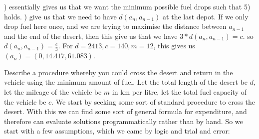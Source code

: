 \documentclass{homework}
\begin{document}
\newline{}) essentially gives us that we want the minimum possible fuel drops such that 5) holds.
\newline{}) give us that we need to have $d(a_n, a_{n-1})$ at the last depot. If we only drop fuel here once, and we are trying to maximise the distance between $a_{n-1}$ and the end of the desert, then this give us that we have $3*d(a_n, a_{n-1}) = c$. so $d(a_n, a_{n-1}) = \frac{c}{3}$. 
\newline\newline
For $d = 2413, c = 140, m = 12$, this gives us $(a_n) = (0, 14.417, 61.083)$. 
\newline\newline


\question Describe a procedure whereby you could cross the desert and return in the vehicle using the minimum amount of fuel.
\newline\newline
Let the total length of the desert be $d$, let the mileage of the vehicle be $m$ in km per litre, let the total fuel capacity of the vehicle be $c$.
\newline\newline
We start by seeking some sort of standard procedure to cross the desert. With this we can find some sort of general formula for expenditure, and therefore can evaluate solutions programmatically rather than by hand. So we start with a few assumptions, which we came by logic and trial and error:
\end{document}
